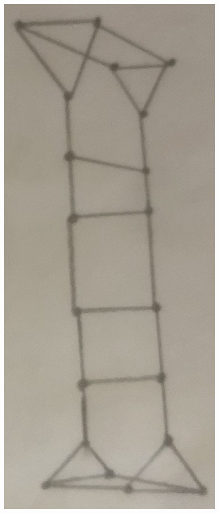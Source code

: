 \documentclass[12pt]{article}
\begin{document}
\begin{center}
\includegraphics[scale=.1,angle=90]{image_50577921.JPG}
\end{center}

\newpage
{}
\end{document}
